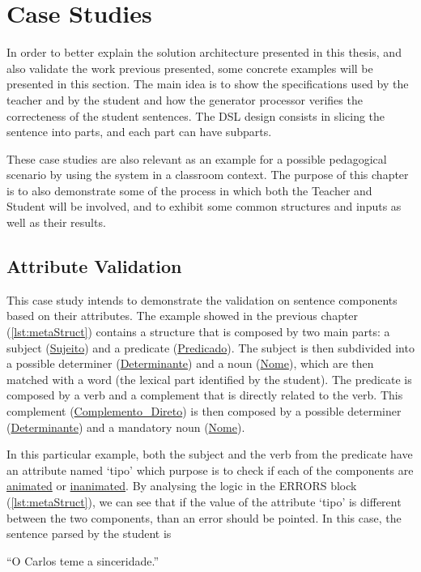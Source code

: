 \chapter{Case Studies} \label{case_study}
In order to better explain the solution architecture presented in this thesis, and also validate the work previous presented, 
some concrete examples will be presented in this section. 
The main idea is to show the specifications used by the teacher and by the student and how the generator processor verifies the correcteness of the student sentences. 
The DSL design consists in slicing the sentence into parts, and each part can have subparts.

These case studies are also relevant as an example for a possible pedagogical scenario by using the system in a classroom context.
The purpose of this chapter is to also demonstrate some of the process in which both the Teacher and Student will be involved, and to exhibit some common structures
and inputs as well as their results.

\section{Attribute Validation}
This case study intends to demonstrate the validation on sentence components based on their attributes. The example showed in the previous chapter 
(\autoref{lst:metaStruct}) contains a structure that is composed by two main parts: a subject (\underline{Sujeito}) and a predicate (\underline{Predicado}). 
The subject is then subdivided into a possible determiner (\underline{Determinante}) and a noun (\underline{Nome}), which are then matched with a word 
(the lexical part identified by the student). The predicate is composed by a verb and a complement that is directly related to the verb. This complement 
(\underline{Complemento\_Direto}) is then composed by a possible determiner (\underline{Determinante}) and a mandatory noun (\underline{Nome}).

In this particular example, both the subject and the verb from the predicate have an attribute named ‘tipo’ which purpose is to check if each of the components
are \underline{animated} or \underline{inanimated}. By analysing the logic in the ERRORS block (\autoref{lst:metaStruct}), we can see that if the value of the attribute ‘tipo’ is different 
between the two components, than an error should be pointed. In this case, the sentence parsed by the student is

``O Carlos teme a sinceridade.''

